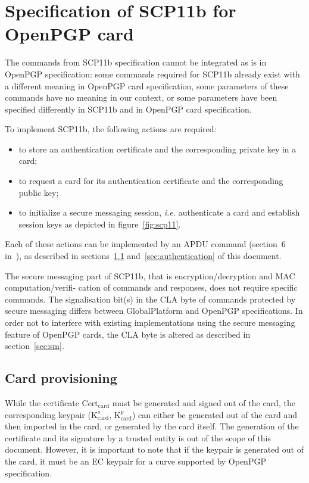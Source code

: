 \documentclass[dvipdfmx,11pt,a4paper,english,final]{article}
\newcommand{\ie}[0]{\textit{i.e.}\xspace}
\newcommand{\gp}[0]{Glo\-bal\-Plat\-form\xspace}
\newcommand{\cardks}[0]{\ensuremath{\mathrm{K}_\mathrm{card}^s}\xspace}
\newcommand{\cardkp}[0]{\ensuremath{\mathrm{K}_\mathrm{card}^p}\xspace}
\newcommand{\cardcert}[0]{\ensuremath{\mathrm{Cert}_\mathrm{card}}\xspace}
\begin{document}
\section{Specification of SCP11b for OpenPGP card}

The commands from SCP11b specification cannot be integrated as is in
OpenPGP specification: some commands required for SCP11b already exist
with a different meaning in OpenPGP card specification, some
parameters of these commands have no meaning in our context, or some
parameters have been specified differently in SCP11b and in OpenPGP
card specification.

To implement SCP11b, the following actions are required:
\begin{itemize}
\item to store an authentication certificate and the corresponding
  private key in a card;
\item to request a card for its authentication certificate and the
  corresponding public key;
\item to initialize a secure messaging session, \ie authenticate a
  card and establish session keys as depicted in
  figure~\ref{fig:scp11}.
\end{itemize}

Each of these actions can be implemented by an APDU command (section~6
in~\cite{gp-scp11}), as described in
sections~\ref{sec:card-provisionning} and~\ref{sec:authentication} of
this document.

The secure messaging part of SCP11b, that is encryption/decryption and
MAC computation/verifi- cation of commands and responses, does not
require specific commands. The signalisation bit(s) in the CLA byte of
commands protected by secure messaging differs between \gp
and OpenPGP specifications. In order not to interfere with existing
implementations using the secure messaging feature of OpenPGP cards,
the CLA byte is altered as described in section~\ref{sec:sm}.

\subsection{Card provisioning}
\label{sec:card-provisionning}

While the certificate \cardcert must be generated and signed out of
the card, the corresponding keypair (\cardks, \cardkp) can either be
generated out of the card and then imported in the card, or generated
by the card itself. The generation of the certificate and its
signature by a trusted entity is out of the scope of this
document. However, it is important to note that if the keypair is
generated out of the card, it must be an EC keypair for a curve
supported by OpenPGP specification.
\end{document}
